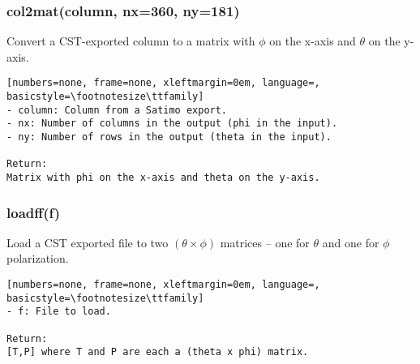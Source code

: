 \subsubsection{col2mat(column, nx=360, ny=181)}
Convert a CST-exported column to a matrix with $\phi$ on the 
x-axis and $\theta$ on the y-axis.

\begin{lstlisting}[numbers=none, frame=none, xleftmargin=0em, language=, basicstyle=\footnotesize\ttfamily]
- column: Column from a Satimo export.
- nx: Number of columns in the output (phi in the input).
- ny: Number of rows in the output (theta in the input).

Return:
Matrix with phi on the x-axis and theta on the y-axis.
\end{lstlisting}

\subsubsection{loadff(f)}
Load a CST exported file to two $(\theta \times \phi)$ matrices -- one for
$\theta$ and one for $\phi$ polarization.

\begin{lstlisting}[numbers=none, frame=none, xleftmargin=0em, language=, basicstyle=\footnotesize\ttfamily]
- f: File to load.

Return:
[T,P] where T and P are each a (theta x phi) matrix.
\end{lstlisting}

